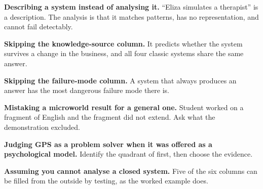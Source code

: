 \begin{pitfall}
\begin{tight}
  \item \textbf{Describing a system instead of analysing it.} ``Eliza simulates a
        therapist'' is a description. The analysis is that it matches patterns, has
        no representation, and cannot fail detectably.
  \item \textbf{Skipping the knowledge-source column.} It predicts whether the
        system survives a change in the business, and all four classic systems
        share the same answer.
  \item \textbf{Skipping the failure-mode column.} A system that always produces an
        answer has the most dangerous failure mode there is.
  \item \textbf{Mistaking a microworld result for a general one.} Student worked on
        a fragment of English and the fragment did not extend. Ask what the
        demonstration excluded.
  \item \textbf{Judging GPS as a problem solver when it was offered as a
        psychological model.} Identify the quadrant of  first, then
        choose the evidence.
  \item \textbf{Assuming you cannot analyse a closed system.} Five of the six
        columns can be filled from the outside by testing, as the worked example
        does.
\end{tight}
\end{pitfall}

